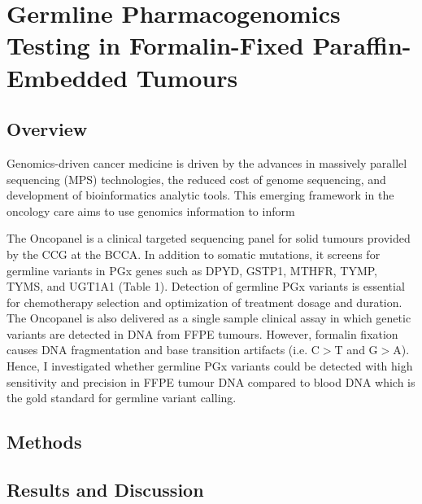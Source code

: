 
\chapter{Germline Pharmacogenomics Testing in Formalin-Fixed Paraffin-Embedded Tumours}
\label{ch:GermlinePharmacogenomicsTestinginFormalin-FixedParaffin-EmbeddedTumours}

\section{Overview}
\label{sec:Overview}

Genomics-driven cancer medicine is driven by the advances in massively parallel sequencing (MPS) technologies, the reduced cost of genome sequencing, and development of bioinformatics analytic tools. This emerging framework in the oncology care aims to use genomics information to inform

The Oncopanel is a clinical targeted sequencing panel for solid tumours provided by the CCG at the BCCA. In addition to somatic mutations, it screens for germline variants in PGx genes such as DPYD, GSTP1, MTHFR, TYMP, TYMS, and UGT1A1 (Table 1). Detection of germline PGx variants is essential for chemotherapy selection and optimization of treatment dosage and duration. The Oncopanel is also delivered as a single sample clinical assay in which genetic variants are detected in DNA from FFPE tumours. However, formalin fixation causes DNA fragmentation and base transition artifacts (i.e. C$>$T and G$>$A). Hence, I investigated whether germline PGx variants could be detected with high sensitivity and precision in FFPE tumour DNA compared to blood DNA which is the gold standard for germline variant calling.

\section{Methods}
\label{sec:Methods}

\section{Results and Discussion}
\label{sec:Results and Discussion}

